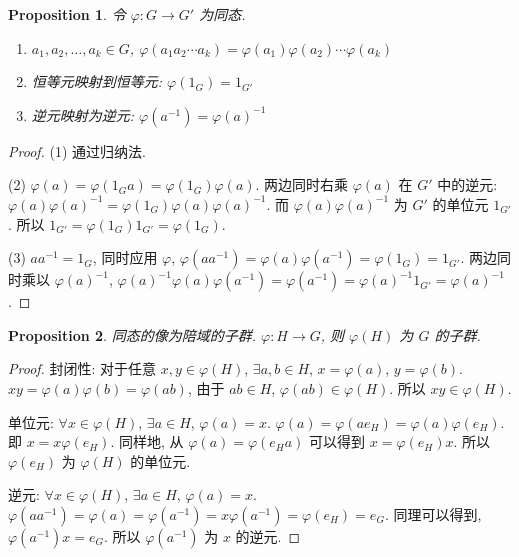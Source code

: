 \documentclass[UTF8]{ctexart}
\theoremstyle{mystyle}
\newtheorem{proposition}{Proposition}[section]
\theoremstyle{myremark}
\theoremstyle{plain}
\begin{document}
\begin{proposition}
    令 $ \varphi \colon G \to G' $ 为同态. 
    \begin{enumerate}
        \item $ a_1, a_2, \dots, a_k \in G $, $ \varphi(a_1 a_2 \cdots a_k) = \varphi(a_1) \varphi(a_2) \cdots \varphi(a_k) $
        \item 恒等元映射到恒等元: $ \varphi(1_G) = 1_{G'} $
        \item 逆元映射为逆元: $ \varphi(a^{-1}) = \varphi(a)^{-1} $
    \end{enumerate}
\end{proposition}


\begin{proof}
    (1) 通过归纳法.

    (2) $ \varphi(a) = \varphi(1_G a) = \varphi(1_G) \varphi(a) $. 两边同时右乘 $ \varphi(a) $ 在 $ G' $ 中的逆元: $ \varphi(a) \varphi(a)^{-1} = \varphi(1_G) \varphi(a) \varphi(a)^{-1} $. 而 $ \varphi(a) \varphi(a)^{-1} $ 为 $ G' $ 的单位元 $ 1_{G'} $. 所以 $ 1_{G'} = \varphi(1_G) 1_{G'} = \varphi(1_G) $.

    (3) $ a a^{-1} = 1_G $, 同时应用 $ \varphi $, $ \varphi(a a^{-1}) = \varphi(a) \varphi(a^{-1}) = \varphi(1_G) = 1_{G'} $. 两边同时乘以 $ \varphi(a)^{-1} $, $ \varphi(a)^{-1} \varphi(a) \varphi(a^{-1}) = \varphi(a^{-1}) = \varphi(a)^{-1} 1_{G'} = \varphi(a)^{-1} $.
\end{proof}

\begin{proposition}
    同态的像为陪域的子群. $ \varphi \colon H \to G $, 则 $ \varphi(H) $ 为 $ G $ 的子群.
\end{proposition}

\begin{proof}
    封闭性: 对于任意 $ x, y \in \varphi(H) $, $ \exists a, b \in H $, $ x = \varphi(a) $, $ y = \varphi(b) $. $ x y = \varphi(a) \varphi(b) = \varphi(a b) $, 由于 $ ab \in H $, $ \varphi(a b) \in \varphi(H) $. 所以 $ x y \in \varphi(H) $.

    单位元: $ \forall x \in \varphi(H) $, $ \exists a \in H $, $ \varphi(a) = x $. $ \varphi(a) = \varphi(a e_H) = \varphi(a) \varphi(e_H) $. 即 $ x = x \varphi(e_H) $. 同样地, 从 $ \varphi(a) = \varphi(e_H a) $ 可以得到 $ x = \varphi(e_H) x $. 所以 $ \varphi(e_H) $ 为 $ \varphi(H) $ 的单位元.

    逆元: $ \forall x \in \varphi(H) $, $ \exists a \in H $, $ \varphi(a) = x $. $ \varphi(a a^{-1}) = \varphi(a) = \varphi(a^{-1}) = x \varphi(a^{-1}) = \varphi(e_H) = e_G $. 同理可以得到, $ \varphi(a^{-1}) x = e_G $. 所以 $ \varphi(a^{-1}) $ 为 $ x $ 的逆元.
\end{proof}
\end{document}
